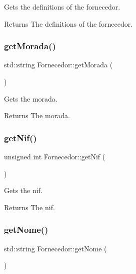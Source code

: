 Gets the definitions of the fornecedor. 

\begin{DoxyReturn}{Returns}
The definitions of the fornecedor. 
\end{DoxyReturn}
\mbox{\label{classFornecedor_ae71fba3a196f749f54956fdbb25ede6a}} 
\subsubsection{\texorpdfstring{get\+Morada()}{getMorada()}}
{\footnotesize\ttfamily std\+::string Fornecedor\+::get\+Morada (\begin{DoxyParamCaption}{ }\end{DoxyParamCaption})\hspace{0.3cm}{\ttfamily [inline]}}



Gets the morada. 

\begin{DoxyReturn}{Returns}
The morada. 
\end{DoxyReturn}
\mbox{\label{classFornecedor_aec536b071f628fc1aa468071fa5a6067}} 
\subsubsection{\texorpdfstring{get\+Nif()}{getNif()}}
{\footnotesize\ttfamily unsigned int Fornecedor\+::get\+Nif (\begin{DoxyParamCaption}{ }\end{DoxyParamCaption})\hspace{0.3cm}{\ttfamily [inline]}}



Gets the nif. 

\begin{DoxyReturn}{Returns}
The nif. 
\end{DoxyReturn}
\mbox{\label{classFornecedor_a8d14dd862259e29adef0e283f15cbb16}} 
\subsubsection{\texorpdfstring{get\+Nome()}{getNome()}}
{\footnotesize\ttfamily std\+::string Fornecedor\+::get\+Nome (\begin{DoxyParamCaption}{ }\end{DoxyParamCaption})\hspace{0.3cm}{\ttfamily [inline]}}



